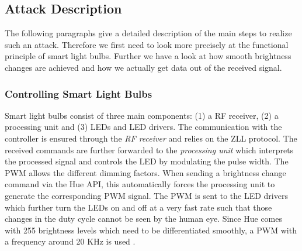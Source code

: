
\subsection{Attack Description} %
\label{sec:exp:description}


The following paragraphs give a detailed description of the main steps to realize such an attack. Therefore we first need to look more precisely at the functional principle of smart light bulbs. Further we have a look at how smooth brightness changes are achieved and how we actually get data out of the received signal.\newline



\subsubsection{Controlling Smart Light Bulbs} 
Smart light bulbs consist of three main components: (1) a RF receiver, (2) a processing unit and (3) LEDs and LED drivers.
The communication with the controller is ensured through the \textit{RF receiver} and relies on the ZLL protocol. The received commands are further forwarded to the \textit{processing unit} which interprets the processed signal and controls the LED by modulating the pulse width. The PWM allows the different dimming factors. When sending a brightness change command via the Hue API, this automatically forces the processing unit to generate the corresponding PWM signal. The PWM is sent to the LED drivers which further turn the LEDs on and off at a very fast rate such that those changes in the duty cycle cannot be seen by the human eye. Since Hue comes with 255 brightness levels which need to be differentiated smoothly, a PWM with a frequency around 20 KHz is used \cite{Ronen:2016:EFAIDCSL}. 

